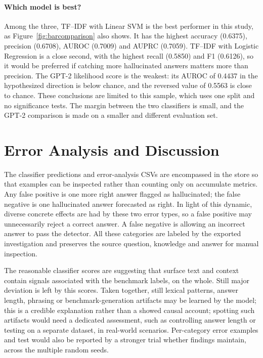 \documentclass[acmsmall,nonacm]{acmart}
\begin{document}
\paragraph{Which model is best?}
Among the three, TF--IDF with Linear SVM is the best performer in this study, as Figure~\ref{fig:barcomparison} also shows. It has the highest accuracy (0.6375), precision (0.6708), AUROC (0.7009) and AUPRC (0.7059). TF--IDF with Logistic Regression is a close second, with the highest recall (0.5850) and F1 (0.6126), so it would be preferred if catching more hallucinated answers matters more than precision. The GPT-2 likelihood score is the weakest: its AUROC of 0.4437 in the hypothesized direction is below chance, and the reversed value of 0.5563 is close to chance. These conclusions are limited to this sample, which uses one split and no significance tests. The margin between the two classifiers is small, and the GPT-2 comparison is made on a smaller and different evaluation set.

\section{Error Analysis and Discussion}
The classifier predictions and error-analysis CSVs are encompassed in the store so that examples can be inspected rather than counting only on accumulate metrics. Any false positive is one more right answer flagged as hallucinated; the false negative is one hallucinated answer forecasted as right. In light of this dynamic, diverse concrete effects are had by these two error types, so a false positive may unnecessarily reject a correct answer. A false negative is allowing an incorrect answer to pass the detector. All these categories are labeled by the exported investigation and preserves the source question, knowledge and answer for manual inspection.

The reasonable classifier scores are suggesting that surface text and context contain signals associated with the benchmark labels, on the whole. Still major deviation is left by this scores. Taken together, still lexical patterns, answer length, phrasing or benchmark-generation artifacts may be learned by the model; this is a credible explanation rather than a showed causal account; spotting such artifacts would need a dedicated assessment, such as controlling answer length or testing on a separate dataset, in real-world scenarios. Per-category error examples and test would also be reported by a stronger trial whether findings maintain, across the multiple random seeds.
\end{document}
